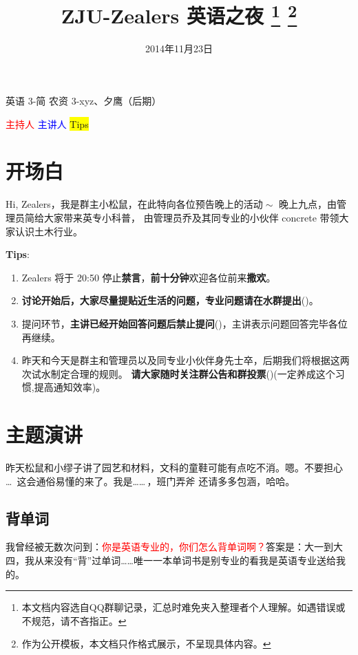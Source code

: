 \documentclass[a4paper,12pt]{ctexart}
\title{\textbf{ZJU-Zealers 英语之夜}%
	\footnote{本文档内容选自QQ群聊记录，汇总时难免夹入整理者个人理解。如遇错误或不规范，请不吝指正。}
	\footnote{作为公开模板，本文档只作格式展示，不呈现具体内容。}
}%
\author{}
\date{2014年11月23日}
\begin{document}
\maketitle
{} %
	 {英语 3-简} %
	 {农资 3-xyz、夕鹰（后期）} %
	 
\begin{center}
	\textcolor{red}{主持人} \quad \textcolor{blue}{主讲人} \quad \colorbox{yellow}{Tips}
\end{center}

\tableofcontents

\section{开场白}
\host
Hi, Zealers，我是群主小松鼠，在此特向各位预告晚上的活动$\!\sim$ 晚上九点，由管理员简给大家带来英专小科普，
由管理员乔及其同专业的小伙伴 concrete 带领大家认识土木行业。 

\textbf{Tips}:
\begin{enumerate}
	\item Zealers 将于 20:50 停止\textbf{禁言}，\textbf{前十分钟}欢迎各位前来\textbf{撒欢}。
	\item \textbf{讨论开始后，大家尽量提贴近生活的问题，专业问题请在水群提出}(\FiveStar)。
	\item 提问环节，\textbf{主讲已经开始回答问题后禁止提问}(\FiveStar)，主讲表示问题回答完毕各位再继续。
	\item 昨天和今天是群主和管理员以及同专业小伙伴身先士卒，后期我们将根据这两次试水制定合理的规则。
	  \textbf{请大家随时关注群公告和群投票}(\FiveStar)(一定养成这个习惯,提高通知效率)。
	  \end{enumerate}

\section{主题演讲}
\lecturer

昨天松鼠和小缪子讲了园艺和材料，文科的童鞋可能有点吃不消。嗯。不要担心 \ldots\ 这会通俗易懂的来了。我是……\,，班门弄斧 还请多多包涵，哈哈。


\subsection{背单词}
我曾经被无数次问到：\textcolor{red}{你是英语专业的，你们怎么背单词啊？}答案是：大一到大四，我从来没有“背”过单词……唯一一本单词书是别专业的看我是英语专业送给我的。
\end{document}
